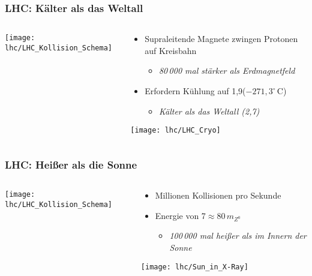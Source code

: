 {  %
  \begin{frame}
    \frametitle{LHC: K\"alter als das Weltall}
    \begin{columns}
      \begin{column}{0.5\textwidth}
        \centering
      \texttt{[image: lhc/LHC\_Kollision\_Schema]}
      \end{column}
      \begin{column}{0.5\textwidth}
        \begin{block}{}
          \begin{itemize}
          \item Supraleitende Magnete zwingen Protonen auf Kreisbahn
            \begin{itemize}
            \item \textit{80\,000 mal st\"arker als Erdmagnetfeld}
            \end{itemize}
          \item Erfordern K\"uhlung auf 1,9\kelvin ($-271,3^{\circ}\,\text{C}$)
            \begin{itemize}
            \item \textit{K\"alter als das Weltall
              (2,7\kelvin)}
            \end{itemize}
          \end{itemize}
          \centering
          \texttt{[image: lhc/LHC\_Cryo]}
        \end{block}
      \end{column}
    \end{columns}
  \end{frame}

  \begin{frame}
    \frametitle{LHC: Hei\ss{}er als die Sonne}
    \begin{columns}
      \begin{column}{0.5\textwidth}
        \centering
      \texttt{[image: lhc/LHC\_Kollision\_Schema]}
      \end{column}
      \begin{column}{0.5\textwidth}
        \begin{block}{}
          \begin{itemize}
          \item {} Millionen Kollisionen pro Sekunde
          \item Energie von 7\tev $\approx80\,m_{Z^{0}}$
            \begin{itemize}
            \item \textit{100\,000 mal hei\ss{}er als im Innern der Sonne}
            \end{itemize}
          \end{itemize}
          \centering
          \texttt{[image: lhc/Sun\_in\_X-Ray]}
        \end{block}
      \end{column}
    \end{columns}
  \end{frame}

}
